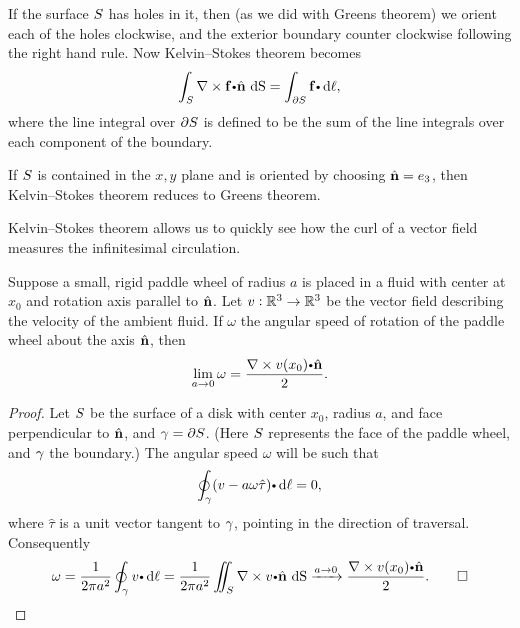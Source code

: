   \begin{remark}
    If the surface $S$ has holes in it, then (as we did with Greens theorem) we orient each of the holes clockwise, and the exterior boundary counter clockwise following the right hand rule.
    Now Kelvin–Stokes theorem becomes
    \begin{equation*}
      \dint_{\superficie} \curlb \funvect{f} \bp \hat{ \vector{n}} \,  \d \S
	= \dint_{\partial \superficie} \funvect{f} \bp \d\ell,
    \end{equation*}
    where the line integral over $\partial S$ is defined to be the sum of the line integrals over each component of the boundary.
  \end{remark}

  \begin{remark}
    If $S$ is contained in the $x, y$ plane and is oriented by choosing $\hat{ \mathbf{ n}} = e_3$, then Kelvin–Stokes theorem reduces to Greens theorem.
  \end{remark}

  Kelvin–Stokes theorem allows us to quickly see how the curl of a vector field measures the infinitesimal circulation.
  \begin{proposition}
    Suppose a small, rigid paddle wheel of radius $a$ is placed in a fluid with center at $x_0$ and rotation axis parallel to $\hat{ \mathbf{ n}}$.
    Let $v:\mathbb{R}^3 \to \mathbb{R}^3$ be the vector field describing the velocity of the ambient fluid.
    If $\omega$ the angular speed of rotation of the paddle wheel about the axis $\hat{ \mathbf{ n}}$, then
    \begin{equation*}
      \lim_{a \to 0} \omega = \dfrac{\curlb v(x_0) \bp \hat{ \vector{n}}}{2}.
    \end{equation*}
  \end{proposition}
  \begin{proof}
    Let $S$ be the surface of a disk with center $x_0$, radius $a$, and face perpendicular to $\hat{ \mathbf{ n}}$, and $\gamma = \partial S$.
    (Here $S$ represents the face of the paddle wheel, and $\gamma$ the boundary.)
    The angular speed $\omega$ will be such that
    \begin{equation*}
      \doint_\caminho (v - a \omega \hat \tau) \bp \d\ell = 0,
    \end{equation*}
    where $\hat \tau$ is a unit vector tangent to $\gamma$, pointing in the direction of traversal.
    Consequently
    \begin{equation*}
      \omega
	= \dfrac{1}{2 \pi a^2} \doint_\caminho v \bp \d\ell
	= \dfrac{1}{2 \pi a^2} \diint_\superficie \curlb v \bp \hat{ \vector{n}} \,  \d \S
	\xrightarrow{a \to 0} \dfrac{\curlb v(x_0) \bp \hat{ \vector{n}}}{2}.
	\qed
    \end{equation*}
  \end{proof}

